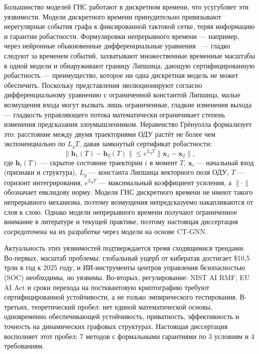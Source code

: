 Большинство моделей ГНС работают в дискретном времени, что усугубляет эти уязвимости. Модели дискретного времени принудительно привязывают нерегулярные события графа к фиксированной тактовой сетке, теряя информацию и гарантии робастности. Формулировки непрерывного времени --- например, через нейронные обыкновенные дифференциальные уравнения~\cite{Chen2018,Chamberlain2021,Rusch2022} --- гладко следуют за временем событий, захватывают множественные временные масштабы в одной модели и обнаруживают границу Липшица, дающую сертифицированную робастность --- преимущество, которое ни одна дискретная модель не может обеспечить. Поскольку представления эволюционируют согласно дифференциальному уравнению с ограниченной константой Липшица, малые возмущения входа могут вызвать лишь ограниченные, гладкие изменения выхода --- гладкость управляющего потока математически ограничивает степень изменения предсказания злоумышленником. Неравенство Грёнуолла формализует это: расстояние между двумя траекториями ОДУ растёт не более чем экспоненциально по $L_g T$, давая замкнутый сертификат робастности:
\begin{equation}
\|\mathbf{h}_1(T)-\mathbf{h}_2(T)\|\le e^{L_g T}\|\mathbf{x}_1-\mathbf{x}_2\|,
\label{eq:gronwall}
\end{equation}
где $\mathbf{h}_i(T)$ --- скрытое состояние траектории $i$ в момент $T$, $\mathbf{x}_i$ --- начальный вход (признаки и структура), $L_g$ --- константа Липшица векторного поля ОДУ, $T$ --- горизонт интегрирования, $e^{L_gT}$ --- максимальный коэффициент усиления, а $\|\cdot\|$ обозначает евклидову норму. Модели ГНС дискретного времени не имеют такого непрерывного механизма, поэтому возмущения непредсказуемо накапливаются от слоя к слою. Однако модели непрерывного времени получают ограниченное внимание в литературе и текущей практике, поэтому настоящая диссертация сосредоточена на их разработке через модели на основе CT-GNN.

Актуальность этих уязвимостей подтверждается тремя сходящимися трендами. Во-первых, масштаб проблемы: глобальный ущерб от кибератак достигает \$10,5 трлн в год к 2025 году, и ИИ-инструменты центров управления безопасностью (SOC) необходимы, но уязвимы. Во-вторых, регулирование: NIST AI RMF, EU AI Act и сроки перехода на постквантовую криптографию требуют сертифицированной устойчивости, а не только эмпирического тестирования. В-третьих, теоретический пробел: нет единой математической основы, одновременно обеспечивающей устойчивость, приватность, эффективность и точность на динамических графовых структурах. Настоящая диссертация восполняет этот пробел: 7 методов с формальными гарантиями по 3 условиям и 4 требованиям.

